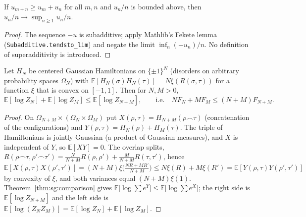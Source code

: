 \begin{lemma}\label{lem:sg:fekete}
  \leanok
If $u_{m+n}\ge u_m+u_n$ for all $m,n$ and $u_n/n$ is bounded above, then $u_n/n\to\sup_{n\ge1}u_n/n$.
\end{lemma}

\begin{proof}
  \leanok
The sequence $-u$ is subadditive; apply Mathlib's Fekete lemma (\texttt{Subadditive.tendsto\_lim}) and negate the limit $\inf_n(-u_n)/n$.
No definition of superadditivity is introduced.
\end{proof}

\begin{theorem}\label{thm:sg:superadd}
  \leanok
Let $H_N$ be centered Gaussian Hamiltonians on $\{\pm1\}^N$ (disorders on arbitrary probability spaces $\Omega_N$) with
$\mathbb E[H_N(\sigma)H_N(\tau)]=N\xi(R(\sigma,\tau))$ for a function $\xi$ that is convex on $[-1,1]$. Then for $N,M>0$,
\[\mathbb E[\log Z_N]+\mathbb E[\log Z_M]\le\mathbb E[\log Z_{N+M}],\qquad\text{i.e.}\quad NF_N+MF_M\le(N+M)F_{N+M}.\]
\end{theorem}

\begin{proof}
  \leanok
On $\Omega_{N+M}\times(\Omega_N\times\Omega_M)$ put $X(\rho,\tau)=H_{N+M}(\rho\frown\tau)$ (concatenation of the configurations) and
$Y(\rho,\tau)=H_N(\rho)+H_M(\tau)$. The triple of Hamiltonians is jointly Gaussian (a product of Gaussian measures), and $X$ is independent of $Y$, so
$\mathbb E[XY]=0$. The overlap splits, $R(\rho\frown\tau,\rho'\frown\tau')=\frac{N}{N+M}R(\rho,\rho')+\frac{M}{N+M}R(\tau,\tau')$, hence
$\mathbb E[X(\rho,\tau)X(\rho',\tau')]=(N+M)\xi\big(\frac{NR+MR'}{N+M}\big)\le N\xi(R)+M\xi(R')=\mathbb E[Y(\rho,\tau)Y(\rho',\tau')]$ by convexity of $\xi$,
and both variances equal $(N+M)\xi(1)$. Theorem~\ref{thm:sg:comparison} gives $\mathbb E\big[\log\sum e^Y\big]\le\mathbb E\big[\log\sum e^X\big]$; the right side is
$\mathbb E[\log Z_{N+M}]$ and the left side is $\mathbb E[\log(Z_NZ_M)]=\mathbb E[\log Z_N]+\mathbb E[\log Z_M]$.
\end{proof}

